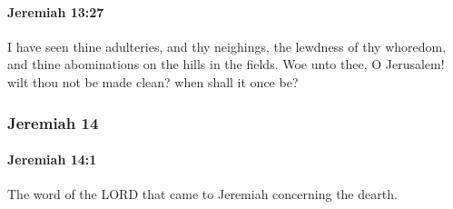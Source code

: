 		\paragraph{Jeremiah 13:27} %
			\label{JEREMIAH-13-27}

			I have seen thine adulteries, and thy neighings, the lewdness of thy whoredom, and thine abominations on the hills in the fields. Woe unto thee, O Jerusalem! wilt thou not be made clean? when shall it once be?

	\subsubsection{Jeremiah 14} %
		\label{JEREMIAH-14}

		\paragraph{Jeremiah 14:1} %
			\label{JEREMIAH-14-1}

			The word of the LORD that came to Jeremiah concerning the dearth.


